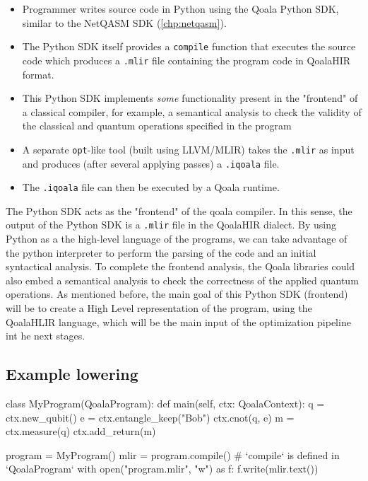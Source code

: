 \begin{itemize}
\item Programmer writes source code in Python using the Qoala Python SDK, similar to the NetQASM SDK (\cref{chp:netqasm}).
\item The Python SDK itself provides a \texttt{compile} function that executes the source code
  which produces a \texttt{.mlir} file containing the program code in QoalaHIR format.
\item This Python SDK implements \textit{some} functionality present in the "frontend" of a classical
  compiler, for example, a semantical analysis to check the validity of the classical and
  quantum operations specified in the program 
\item A separate \texttt{opt}-like tool (built using LLVM/MLIR) takes the \texttt{.mlir} as input and produces
  (after several applying passes) a \texttt{.iqoala} file.
\item The \texttt{.iqoala} file can then be executed by a Qoala runtime.
\end{itemize}

The Python SDK acts as the "frontend" of the qoala compiler. In this sense,
the output of the Python SDK is a \texttt{.mlir} file in the QoalaHIR dialect.
By using Python as a the high-level language of the programs, we can take advantage
of the python interpreter to perform the parsing of the code and an initial
syntactical analysis.
To complete the frontend analysis, the Qoala libraries could also embed a
semantical analysis to check the correctness of the applied quantum operations.
As mentioned before, the main goal of this Python SDK (frontend) will be to
create a High Level representation of the program, using the QoalaHLIR
language, which will be the main input of the optimization pipeline int he next stages.




\subsection{Example lowering}

\begin{pycode}
class MyProgram(QoalaProgram):
    def main(self, ctx: QoalaContext):
        q = ctx.new_qubit()
        e = ctx.entangle_keep("Bob")
        ctx.cnot(q, e)
        m = ctx.measure(q)
        ctx.add_return(m)

program = MyProgram()
mlir = program.compile()  # `compile` is defined in `QoalaProgram`
with open("program.mlir", "w") as f:
    f.write(mlir.text())
\end{pycode}

